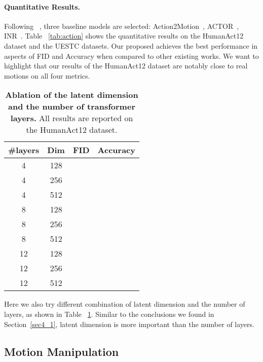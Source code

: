 \paragraph{Quantitative Results.}\label{sec4_2_4} Following ~\cite{cervantes2022implicit}, three baseline models are selected: Action2Motion~\citep{guo2020action2motion}, ACTOR~\citep{petrovich2021action}, INR~\citep{cervantes2022implicit}. Table ~\ref{tab:action} shows the quantitative results on the HumanAct12 dataset and the UESTC datasets. Our proposed \name achieves the best performance in aspects of FID and Accuracy when compared to other existing works. We want to highlight that our results of the HumanAct12 dataset are notably close to real motions on all four metrics. 


\begin{table}[ht]
\centering
\caption{\textbf{Ablation of the latent dimension and the number of transformer layers.} All results are reported on the HumanAct12 dataset.}
\label{tab:action_feat_layer}
\setlength{\tabcolsep}{1.4mm}
{
\begin{tabular}{cccc}
\hline

\#layers & Dim & FID & Accuracy  \\
\hline
4 & 128 &  &  \\
4 & 256 &  &  \\
4 & 512 &  &  \\
8 & 128 &  &  \\
8 & 256 &  &  \\
8 & 512 &  &  \\
12 & 128 &  &  \\
12 & 256 &  &  \\
12 & 512 &  &  \\
\hline
\end{tabular}}
\end{table}

Here we also try different combination of latent dimension and the number of layers, as shown in Table ~\ref{tab:action_feat_layer}. Similar to the conclusions we found in Section~\ref{sec4_1}, latent dimension is more important than the number of layers.


\subsection{Motion Manipulation}\label{sec4_3}

